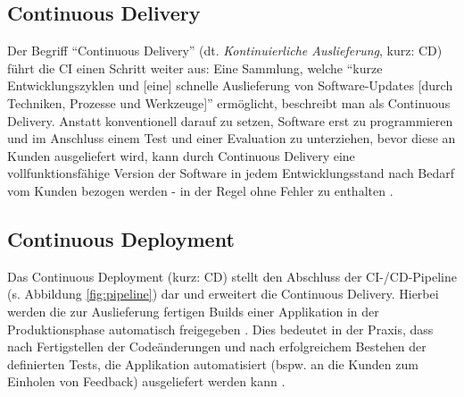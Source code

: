 \subsection{Continuous Delivery}
Der Begriff \enquote{Continuous Delivery} (dt. \textit{Kontinuierliche Auslieferung}, kurz: CD) führt die CI einen Schritt weiter aus: Eine Sammlung, welche \enquote{kurze Entwicklungszyklen und [eine] schnelle Auslieferung von Software-Updates [durch Techniken, Prozesse und Werkzeuge]} \cite{Ilanrr:2017aa}
ermöglicht, beschreibt man als Continuous Delivery. Anstatt konventionell darauf zu setzen, Software erst zu programmieren und im Anschluss einem Test und einer Evaluation zu unterziehen, bevor diese an Kunden ausgeliefert wird, kann durch Continuous Delivery eine vollfunktionsfähige Version der Software
in jedem Entwicklungsstand nach Bedarf vom Kunden bezogen werden - in der Regel ohne Fehler zu enthalten \cite{Ilanrr:2017aa}.

\subsection{Continuous Deployment}
Das Continuous Deployment (kurz: CD) stellt den Abschluss der CI-/CD-Pipeline (s. Abbildung \ref{fig:pipeline}) dar und erweitert die Continuous Delivery. Hierbei werden die zur Auslieferung fertigen Builds einer Applikation in der Produktionsphase automatisch freigegeben \cite{RedHat:2020aa}. Dies bedeutet in der Praxis,
dass nach Fertigstellen der Codeänderungen und nach erfolgreichem Bestehen der definierten Tests, die Applikation automatisiert (bspw. an die Kunden zum Einholen von Feedback) ausgeliefert werden kann \cite{RedHat:2020aa}.


